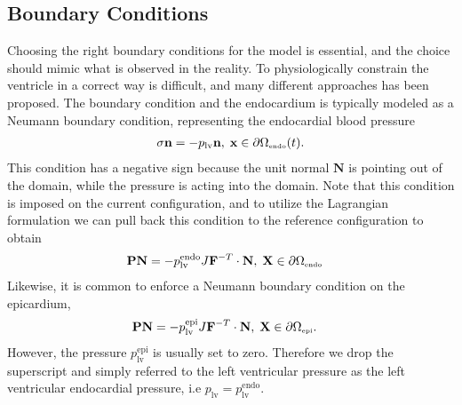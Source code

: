 \subsection{Boundary Conditions}
\label{sec:mech_boudary}


Choosing the right boundary conditions for the model is essential,
and the choice should mimic what is observed in the reality. To
physiologically constrain the ventricle in a correct way is difficult,
and many different approaches has been proposed.
The boundary condition and the endocardium is typically modeled as a
Neumann boundary condition, representing the endocardial blood
pressure
\begin{align}
  \sigma \mathbf{n} = -p_{\mathrm{lv}} \mathbf{n}, \;  \mathbf{x} \in  \partial \Omega_{ \textnormal{\tiny \text{endo}}}(t).
\end{align}
This condition has a negative sign because the unit normal
$\mathbf{N}$ is pointing out of the domain, while the pressure is
acting into the domain. 
Note that this condition is imposed on the current configuration, and
to utilize the Lagrangian formulation we can pull back this condition
to the reference configuration to obtain
\begin{align}
  \mathbf{P}\mathbf{N} &= -p_{\mathrm{lv}}^{\mathrm{endo}} J\mathbf{F}^{-T} \cdot \mathbf{N}, \;  \mathbf{X} \in \partial \Omega_{ \textnormal{\tiny \text{endo}}}
\end{align}
Likewise, it is common to enforce a
Neumann boundary condition on the epicardium,
\begin{align}
\mathbf{P}\mathbf{N}  &= -p_{\mathrm{lv}}^{\mathrm{epi}} J\mathbf{F}^{-T} \cdot \mathbf{N}, \;  \mathbf{X} \in \partial \Omega_{ \textnormal{\tiny \text{epi}}}.
\end{align}
However, the pressure $p_{\mathrm{lv}}^{\mathrm{epi}}$ is usually set
to zero. Therefore we drop the superscript and simply referred to the
left ventricular pressure as the left ventricular endocardial
pressure, i.e $p_{\mathrm{lv}} = p_{\mathrm{lv}}^{\mathrm{endo}}$.

